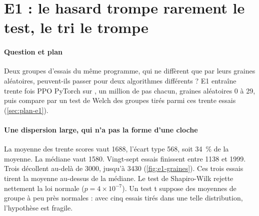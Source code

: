 \section{E1 : le hasard trompe rarement le test, le tri le trompe}\label{sec:e1}

\paragraph{Question et plan}
Deux groupes d'essais du même programme, qui ne diffèrent que par leurs graines aléatoires, peuvent-ils
passer pour deux algorithmes différents ? E1 entraîne trente fois PPO PyTorch sur , un
million de pas chacun, graines aléatoires 0 à 29, puis compare par un test de Welch des groupes tirés parmi
ces trente essais (\cref{sec:plan-e1}).

\paragraph{Une dispersion large, qui n'a pas la forme d'une cloche}
La moyenne des trente scores vaut \num{1688}, l'écart type 568, soit 34~\% de la moyenne. La médiane vaut
\num{1580}. Vingt-sept essais finissent entre \num{1138} et \num{1999}. Trois décollent au-delà de \num{3000},
jusqu'à \num{3430} (\cref{fig:e1-graines}). Ces trois essais tirent la moyenne au-dessus de la médiane. Le test
de Shapiro-Wilk rejette nettement la loi normale ($p = 4\times10^{-7}$). Un test t suppose des moyennes de
groupe à peu près normales : avec cinq essais tirés dans une telle distribution, l'hypothèse est fragile.


